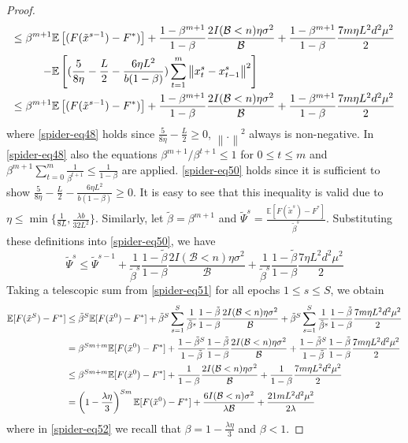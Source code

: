 \documentclass[iicol,sn-basic]{sn-jnl}
\theoremstyle{thmstyleone}%
\theoremstyle{thmstyletwo}%
\theoremstyle{thmstylethree}%
\newcommand*{\E}{\mathbb{E}}
\newcommand{\norm}[1]{\left\lVert#1\right\rVert}
\begin{document}
\begin{proof}
\begin{align}
\leq\beta^{m+1}\E&\left[(F(\tilde{x}^{s-1}) - F^*)\right] + \frac{1-\beta^{m+1}}{1-\beta}\frac{2I(\mathcal{B} < n)\eta \sigma ^2}{\mathcal{B}}+\frac{1-\beta^{m+1}}{1-\beta} \frac{7 m \eta L^2 d^2 \mu^2}{2}\notag
\\-\E&\left[(\frac{5}{8\eta} - \frac{L}{2} - \frac{6\eta L^2}{b(1-\beta)})\sum_{t=1}^m \norm{{x}_{t}^s-x_{t-1}^s}^2 \right]\label{spider-eq48}\\
\leq\beta^{m+1}\E&\left[(F(\tilde{x}^{s-1}) - F^*)\right] + \frac{1-\beta^{m+1}}{1-\beta}\frac{2I(\mathcal{B} < n)\eta \sigma ^2}{\mathcal{B}}+\frac{1-\beta^{m+1}}{1-\beta}\frac{7 m \eta L^2 d^2 \mu^2}{2}\label{spider-eq50}
\end{align}
where \eqref{spider-eq48} holds since $\frac{5}{8\eta} - \frac{L}{2} \geq 0$, $\norm{.}^2$ always is non-negative. In \eqref{spider-eq48} also the equations $\beta^{m+1} / \beta^{t+1} \leq 1$ for $0 \leq t \leq m$ and $\beta^{m+1}\sum_{t=0}^m \frac{1}{\beta^{t+1}} \leq \frac{1}{1-\beta}$ are applied. \eqref{spider-eq50} holds since it is sufficient to show $\frac{5}{8\eta} - \frac{L}{2} - \frac{6\eta L^2}{b (1- \beta)} \geq 0$. 
It is easy to see that this inequality is valid due to $\eta \leq \min\{\frac{1}{8L}, \frac{\lambda b}{32 L^2}\}$. Similarly, let  $\tilde{\beta} = \beta^{m+1}$ and $\tilde{\Psi}^s = \frac{\E[F(\tilde{x}^{s})-F^*]}{\tilde{\beta}^s}$. Substituting these definitions into \eqref{spider-eq50}, we have
\begin{equation}\label{spider-eq51}
\tilde{\Psi}^s \leq \tilde{\Psi}^{s-1} + \frac{1}{\tilde{\beta}^s} \frac{1-\tilde{\beta}}{1-{\beta}}\frac{2 I(\mathcal{B} < n)\eta \sigma ^2}{\mathcal{B}}+ \frac{1}{\tilde{\beta}^s} \frac{1-\tilde{\beta}}{1-{\beta}}\frac{7\eta L^2 d^2 \mu^2}{2}
\end{equation}
Taking a telescopic sum from \eqref{spider-eq51} for all epochs $1 \leq s \leq S$, we obtain
\begin{align}
\E[F(\tilde{x}^S) - {F}^*] & \leq \tilde{\beta}^{S} \E[F(\tilde{x}^0) - {F}^*] + \tilde{\beta}^{S} \sum_{s=1}^S \frac{1}{\tilde{\beta}^s}\frac{1-\tilde{\beta}}{1-{\beta}}\frac{2I(\mathcal{B} < n)\eta \sigma ^2}{\mathcal{B}} + \tilde{\beta}^{S} \sum_{s=1}^S \frac{1}{\tilde{\beta}^s}\frac{1-\tilde{\beta}}{1-{\beta}}\frac{7 m \eta L^2 d^2 \mu^2}{2}\notag\\
& = {\beta}^{Sm + m} \E[F(\tilde{x}^0) - {F}^*] + \frac{1-\tilde{\beta}^S}{1-\tilde{\beta}}\frac{1-\tilde{\beta}}{1-{\beta}}\frac{2I(\mathcal{B} < n)\eta \sigma ^2}{\mathcal{B}}+ \frac{1-\tilde{\beta}^S}{1-\tilde{\beta}}\frac{1-\tilde{\beta}}{1-{\beta}}\frac{7 m \eta L^2 d^2 \mu^2}{2}\notag\\
& \leq {\beta}^{Sm + m} \E[F(\tilde{x}^0) - {F}^*] + \frac{1}{1-{\beta}}\frac{2 I(\mathcal{B} < n)\eta \sigma ^2}{\mathcal{B}}+ \frac{1}{1-{\beta}}\frac{7 m \eta L^2 d^2 \mu^2}{2}\notag\\
& = \left(1-\frac{\lambda\eta}{3}\right)^{Sm} \E[F(\tilde{x}^0) - {F}^*] + \frac{6I(\mathcal{B} < n) \sigma ^2}{\lambda\mathcal{B}}+\frac{21 m L^2 d^2 \mu^2}{2\lambda}\label{spider-eq52}
\end{align}
where in \eqref{spider-eq52} we recall that $\beta = 1-\frac{\lambda\eta}{3}$ and $\beta < 1$.
\end{proof}
\end{document}
